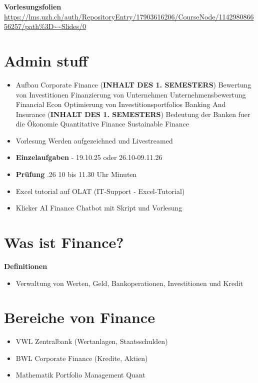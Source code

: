 \textbf{Vorlesungsfolien} \url{https://lms.uzh.ch/auth/RepositoryEntry/17903616206/CourseNode/114298086656257/path%3D~~Slides/0}
\section{Admin stuff}
\begin{itemize}
    \item Aufbau
    \subitem Corporate Finance (\textbf{INHALT DES 1. SEMESTERS})
        \subsubitem Bewertung von Investitionen
        \subsubitem Finanzierung von Unternehmen
        \subsubitem  Unternehmensbewertung
    \subitem Financial Econ
        \subsubitem Optimierung von Investitionsportfolios 
    \subitem Banking And Insurance (\textbf{INHALT DES 1. SEMESTERS})
        \subsubitem Bedeutung der Banken fuer die Ökonomie
    \subitem Quantitative Finance
    \subitem Sustainable Finance
    \item Vorlesung
        \subitem Werden aufgezeichned und Livestreamed 
    \item \textbf{Einzelaufgaben}
         - 19.10.25 oder 26.10-09.11.26
    \item \textbf{Prüfung}
        .26 10 bis 11.30 Uhr
         Minuten 
    \item Excel tutorial auf OLAT (IT-Support - Excel-Tutorial)
    \item Klicker AI Finance Chatbot mit Skript und Vorlesung 
\end{itemize}

\section{Was ist Finance?}
\textbf{Definitionen}
\begin{itemize}
    \item Verwaltung von Werten, Geld, Bankoperationen, Investitionen und Kredit
\end{itemize}
\break
\section{Bereiche von Finance}
\begin{itemize}
    \item VWL
        \subitem Zentralbank (Wertanlagen, Staatsschulden) 
    \item BWL
        \subitem Corporate Finance (Kredite, Aktien) 
    \item Mathematik
        \subitem Portfolio Management Quant   
\end{itemize}

